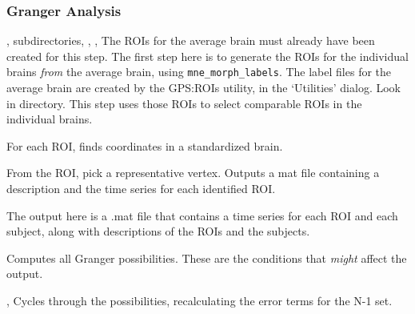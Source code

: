 \documentclass[11pt]{article}
\begin{document}
\subsubsection{Granger Analysis}

\begin{itemize}

%
{, subdirectories, %
,
,}
 The ROIs for the average brain must already have been created for
 this step.  The first step here is to generate the ROIs for the
 individual brains \emph{from} the average brain, using
 \texttt{mne\_morph\_labels}.
The label files for the average brain are created by the GPS:ROIs
  utility, in the `Utilities' dialog.  Look in
   directory.  This step uses those ROIs to select
  comparable ROIs in the individual brains.

%
{} For
each ROI, finds coordinates in a
  standardized brain.  %

%
{}
From the ROI,
pick a representative vertex.  Outputs a mat file containing a
description and the time series for each identified ROI.

%
{} The output here is a .mat file that
contains a time series for each ROI and each subject, along with
descriptions of the ROIs and the subjects.

%
{} Computes all Granger
possibilities.  These are the conditions that \emph{might} affect the output.

%
{,
  }  Cycles through the
possibilities, recalculating the error terms for the N-1 set.

\end{itemize}
\end{document}
